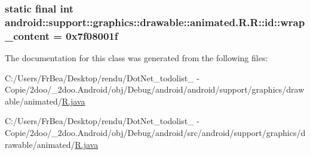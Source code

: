 \hypertarget{classandroid_1_1support_1_1graphics_1_1drawable_1_1animated_1_1_r_1_1id_96152fd5d70c56e4fad361e5fbbe1e33}{
\subsubsection[{wrap\_\-content}]{\setlength{\rightskip}{0pt plus 5cm}static final int android::support::graphics::drawable::animated.R.R::id::wrap\_\-content = 0x7f08001f}}
\label{classandroid_1_1support_1_1graphics_1_1drawable_1_1animated_1_1_r_1_1id_96152fd5d70c56e4fad361e5fbbe1e33}




The documentation for this class was generated from the following files:\begin{CompactItemize}
\item 
C:/Users/FrBea/Desktop/rendu/DotNet\_\-todolist\_ - Copie/2doo/\_\-2doo.Android/obj/Debug/android/android/support/graphics/drawable/animated/\hyperlink{android_2support_2graphics_2drawable_2animated_2_r_8java}{R.java}\item 
C:/Users/FrBea/Desktop/rendu/DotNet\_\-todolist\_ - Copie/2doo/\_\-2doo.Android/obj/Debug/android/src/android/support/graphics/drawable/animated/\hyperlink{src_2android_2support_2graphics_2drawable_2animated_2_r_8java}{R.java}\end{CompactItemize}
